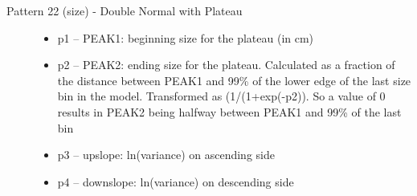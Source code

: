 \begin{description}
	\item[Pattern 22 (size) - Double Normal with Plateau]\hfil
	\begin{itemize}
		\item p1 – PEAK1:  beginning size for the plateau (in cm)
		\item p2 – PEAK2:  ending size for the plateau.  Calculated as a fraction of the distance between PEAK1 and 99\% of the lower edge of the last size bin in the model.  Transformed as (1/(1+exp(-p2)).   So a value of 0 results in PEAK2 being halfway between PEAK1 and 99\% of the last bin
		\item p3 – upslope:  ln(variance) on ascending side
		\item p4 – downslope:  ln(variance) on descending side
	\end{itemize}
\end{description}

